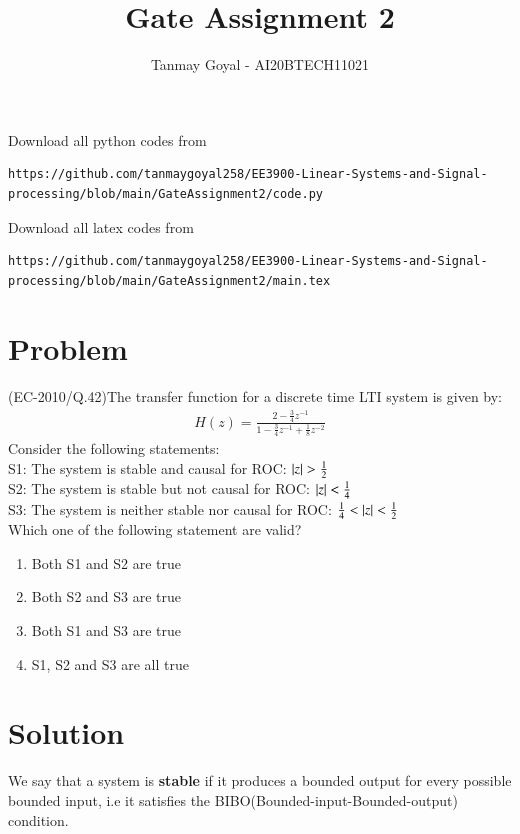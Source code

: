 \documentclass[journal,12pt,twocolumn]{IEEEtran}
\begin{document}
\def\putbox#1#2#3{\makebox[0in][l]{\makebox[#1][l]{}\raisebox{\baselineskip}[0in][0in]{\raisebox{#2}[0in][0in]{#3}}}}
     \def\rightbox#1{\makebox[0in][r]{#1}}
     \def\centbox#1{\makebox[0in]{#1}}
     \def\topbox#1{\raisebox{-\baselineskip}[0in][0in]{#1}}
     \def\midbox#1{\raisebox{-0.5\baselineskip}[0in][0in]{#1}}
\vspace{3cm}
\title{Gate Assignment 2}
\author{Tanmay Goyal - AI20BTECH11021}
\maketitle
\newpage
\bigskip
\renewcommand{\thefigure}{\theenumi}
\renewcommand{\thetable}{\theenumi}
Download all python codes from 
\begin{lstlisting}
https://github.com/tanmaygoyal258/EE3900-Linear-Systems-and-Signal-processing/blob/main/GateAssignment2/code.py
\end{lstlisting}
Download all latex codes from 
\begin{lstlisting}
https://github.com/tanmaygoyal258/EE3900-Linear-Systems-and-Signal-processing/blob/main/GateAssignment2/main.tex
\end{lstlisting}
\section{Problem}
(EC-2010/Q.42)The transfer function for a discrete time LTI system is given by:
\begin{align}
    H(z) = \frac{2 - \frac{3}{4}z^{-1}}{1 - \frac{3}{4}z^{-1} + \frac{1}{8}z^{-2}}
\end{align}
Consider the following statements:\\
S1: The system is stable and causal for ROC: $\left\vert z\right\vert > \frac{1}{2}$\\
S2: The system is stable but not causal for ROC:  $\left\vert z\right\vert < \frac{1}{4}$\\
S3: The system is neither stable nor causal for ROC:  $\frac{1}{4}<\left\vert z\right\vert < \frac{1}{2}$\\
Which one of the following statement are valid?
\begin{enumerate}
    \item Both S1 and S2 are true
    \item Both S2 and S3 are true
    \item Both S1 and S3 are true
    \item S1, S2 and S3 are all true
\end{enumerate}
\section{Solution}
\begin{definition}
We say that a system is \textbf{stable} if it produces a bounded output for every possible bounded input, i.e it satisfies the BIBO(Bounded-input-Bounded-output) condition.
\end{definition}
\end{document}
